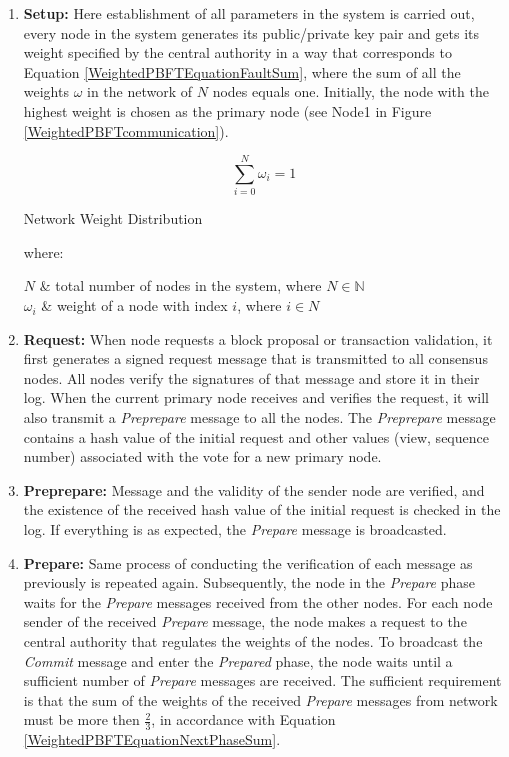 \begin{enumerate}
    \item \textbf{Setup:} Here establishment of all parameters in the system is carried out, every node in the system generates its public/private key pair and gets its weight specified by the central authority in a way that corresponds to Equation \ref{WeightedPBFTEquationFaultSum}, where the sum of all the weights $\omega$ in the network of $N$ nodes equals one. Initially, the node with the highest weight is chosen as the primary node (see Node1 in Figure \ref{WeightedPBFTcommunication}).

    \begin{equation}
        \sum_{i=0}^{N} \omega_i = 1
        \label{WeightedPBFTEquationFaultSum}
    \end{equation}
    \begin{center}
        Network Weight Distribution
    \end{center}
    where:
    \begin{conditions}
     $N$     &  total number of nodes in the system, where $N \in \mathbb{N}$\\
     $\omega_i$     &  weight of a node with index $i$, where $i \in N$
    \end{conditions}
    
    \item \textbf{Request:} When node requests a block proposal or transaction validation, it first generates a signed request message that is transmitted to all consensus nodes. All nodes verify the signatures of that message and store it in their log. When the current primary node receives and verifies the request, it will also transmit a \emph{Preprepare} message to all the nodes. The \emph{Preprepare} message contains a hash value of the initial request and other values (view, sequence number) associated with the vote for a new primary node. 
    \item \textbf{Preprepare:}  Message and the validity of the sender node are verified, and the existence of the received hash value of the initial request is checked in the log. If everything is as expected, the \emph{Prepare} message is broadcasted.
    \item \textbf{Prepare:} Same process of conducting the verification of each message as previously is repeated again. Subsequently, the node in the \emph{Prepare} phase waits for the \emph{Prepare} messages received from the other nodes. For each node sender of the received \emph{Prepare} message, the node makes a request to the central authority that regulates the weights of the nodes. To broadcast the \emph{Commit} message and enter the \emph{Prepared} phase, the node waits until a sufficient number of \emph{Prepare} messages are received. The sufficient requirement is that the sum of the weights of the received \emph{Prepare} messages from network must be more then $\frac{2}{3}$, in accordance with Equation \ref{WeightedPBFTEquationNextPhaseSum}.
  

\end{enumerate}
